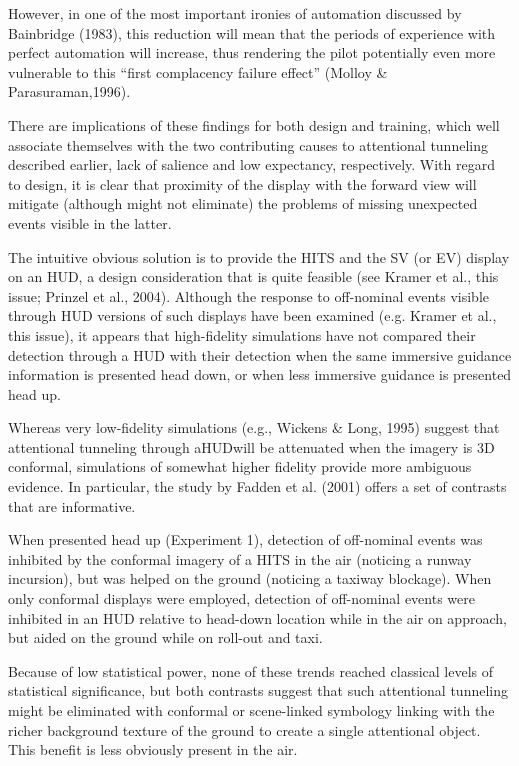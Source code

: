 \documentclass[utf8,bachelor,manualbib]{gradu3}
\begin{document}
However, in one of the most important ironies of automation discussed by Bainbridge
(1983), this reduction will mean that the periods of experience with perfect
automation will increase, thus rendering the pilot potentially even more vulnerable
to this “first complacency failure effect” (Molloy \& Parasuraman,1996).

There are implications of these findings for both design and training, which well associate themselves with the two contributing causes to attentional tunneling described
earlier, lack of salience and low expectancy, respectively. With regard to design, it is clear that proximity of the display with the forward view will mitigate (although might not eliminate) the problems of missing unexpected events visible in the latter.

The intuitive obvious solution is to provide the HITS and the SV (or EV) display on an HUD, a design consideration that is quite feasible (see Kramer et al., this issue; Prinzel et al., 2004). Although the response to off-nominal events visible through HUD versions of such displays have been examined (e.g. Kramer et al., this issue), it appears that high-fidelity simulations have not compared their detection through a HUD with their detection when the same immersive guidance information is presented head down, or when less immersive guidance is presented head up.






Whereas very low-fidelity simulations (e.g., Wickens \& Long, 1995) suggest that attentional tunneling through aHUDwill be attenuated when the imagery is 3D conformal, simulations of somewhat higher fidelity provide more ambiguous evidence. In particular, the study by Fadden et al. (2001) offers a set of contrasts that are informative.

When presented head up (Experiment 1), detection of off-nominal events was inhibited by the conformal imagery of a HITS in the air (noticing a runway incursion), but was helped on the ground (noticing a taxiway blockage). When only conformal displays were employed, detection of off-nominal events were inhibited in an HUD relative to head-down location while in the air on approach, but aided on the ground while on roll-out and taxi.

Because of low statistical power, none of these trends reached classical levels of statistical significance, but both contrasts suggest that such attentional tunneling might be eliminated with conformal or scene-linked symbology linking with the richer background texture of the ground to create a single attentional object. This benefit is less obviously present in the air.
\end{document}
